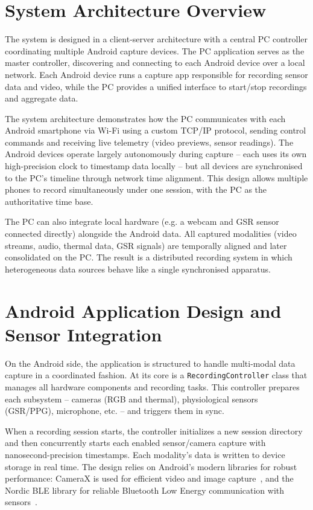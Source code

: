 \section{System Architecture Overview}

The system is designed in a client-server architecture with a central PC controller coordinating multiple Android capture devices. The PC application serves as the master controller, discovering and connecting to each Android device over a local network. Each Android device runs a capture app responsible for recording sensor data and video, while the PC provides a unified interface to start/stop recordings and aggregate data.

The system architecture demonstrates how the PC communicates with each Android smartphone via Wi-Fi using a custom TCP/IP protocol, sending control commands and receiving live telemetry (video previews, sensor readings). The Android devices operate largely autonomously during capture -- each uses its own high-precision clock to timestamp data locally -- but all devices are synchronised to the PC's timeline through network time alignment. This design allows multiple phones to record simultaneously under one session, with the PC as the authoritative time base.

The PC can also integrate local hardware (e.g. a webcam and GSR sensor connected directly) alongside the Android data. All captured modalities (video streams, audio, thermal data, GSR signals) are temporally aligned and later consolidated on the PC. The result is a distributed recording system in which heterogeneous data sources behave like a single synchronised apparatus.

\section{Android Application Design and Sensor Integration}

On the Android side, the application is structured to handle multi-modal data capture in a coordinated fashion. At its core is a \texttt{RecordingController} class that manages all hardware components and recording tasks. This controller prepares each subsystem -- cameras (RGB and thermal), physiological sensors (GSR/PPG), microphone, etc. -- and triggers them in sync.

When a recording session starts, the controller initializes a new session directory and then concurrently starts each enabled sensor/camera capture with nanosecond-precision timestamps. Each modality's data is written to device storage in real time. The design relies on Android's modern libraries for robust performance: CameraX is used for efficient video and image capture~\cite{android2025camerax}, and the Nordic BLE library for reliable Bluetooth Low Energy communication with sensors~\cite{nordic2025ble}.

